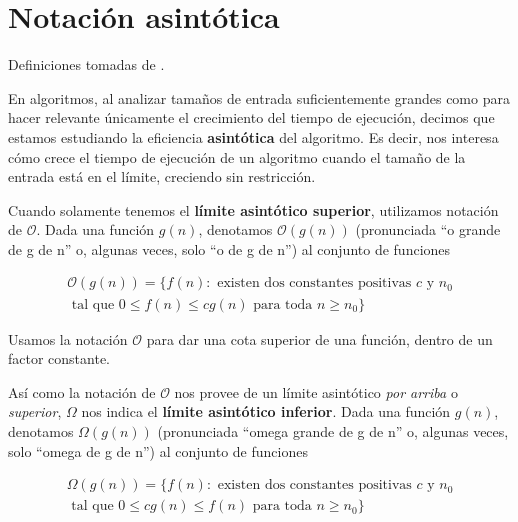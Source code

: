 \section{Notaci\'on asint\'otica}

Definiciones tomadas de \cite{cormenetal}.

En algoritmos, al analizar tamaños de entrada suficientemente grandes como para hacer relevante \'unicamente el crecimiento del tiempo de ejecuci\'on, decimos que estamos estudiando la eficiencia \textbf{asint\'otica} del algoritmo. Es decir, nos interesa c\'omo crece el tiempo de ejecuci\'on de un algoritmo cuando el tamaño de la entrada est\'a en el l\'imite, creciendo sin restricci\'on.

\begin{definition}
Cuando solamente tenemos el \textbf{l\'imite asint\'otico superior}, utilizamos notaci\'on de $\mathcal{O}$. Dada una funci\'on $g(n)$, denotamos $\mathcal{O}(g(n))$ (pronunciada ``o grande de g de n'' o, algunas veces, solo ``o de g de n'') al conjunto de funciones
\end{definition}

\begin{equation*}
\begin{split}
\mathcal{O}(g(n)) = \{f(n): \text{ existen dos constantes positivas } c \text{ y } n_0 \\
\text{ tal que } 0 \leq f(n) \leq cg(n) \text{ para toda } n \geq n_0\}
\end{split}
\end{equation*}

Usamos la notaci\'on $\mathcal{O}$ para dar una cota superior de una funci\'on, dentro de un factor constante.

\begin{definition}

As\'i como la notaci\'on de $\mathcal{O}$ nos provee de un l\'imite asint\'otico \textit{por arriba} o \textit{superior}, $\Omega$ nos indica el \textbf{l\'imite asint\'otico inferior}. Dada una funci\'on $g(n)$, denotamos $\Omega(g(n))$ (pronunciada ``omega grande de g de n'' o, algunas veces, solo ``omega de g de n'') al conjunto de funciones
\end{definition}

\begin{equation*}
\begin{split}
\Omega(g(n)) = \{f(n): \text{ existen dos constantes positivas } c \text{ y } n_0 \\ \text{ tal que } 0 \leq cg(n) \leq f(n) \text{ para toda } n \geq n_0\}
\end{split}
\end{equation*}

